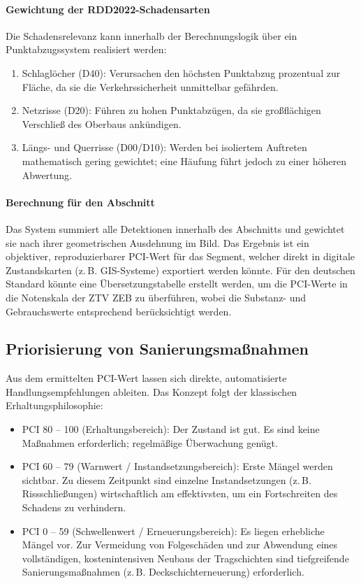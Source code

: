 \paragraph{Gewichtung der RDD2022-Schadensarten}
Die Schadensrelevanz kann innerhalb der Berechnungslogik über ein Punktabzugssystem realisiert werden:
\begin{enumerate}
    \item Schlaglöcher (D40): Verursachen den höchsten Punktabzug prozentual zur Fläche, da sie die Verkehrssicherheit unmittelbar gefährden.
    \item Netzrisse (D20): Führen zu hohen Punktabzügen, da sie großflächigen Verschließ des Oberbaus ankündigen.
    \item Längs- und Querrisse (D00/D10): Werden bei isoliertem Auftreten mathematisch gering gewichtet; eine Häufung führt jedoch zu einer höheren Abwertung.
\end{enumerate}

\paragraph{Berechnung für den Abschnitt}
Das System summiert alle Detektionen innerhalb des Abschnitts und gewichtet sie nach ihrer geometrischen Ausdehnung im Bild. Das Ergebnis ist ein objektiver, reproduzierbarer PCI-Wert für das Segment, welcher direkt in digitale Zustandskarten (z.\,B. GIS-Systeme) exportiert werden könnte. Für den deutschen Standard könnte eine Übersetzungstabelle erstellt werden, um die PCI-Werte in die Notenskala der ZTV ZEB zu überführen, wobei die Substanz- und Gebrauchswerte entsprechend berücksichtigt werden.

\subsection{Priorisierung von Sanierungsmaßnahmen}
\label{subsec:priorisierung}

Aus dem ermittelten PCI-Wert lassen sich direkte, automatisierte Handlungsempfehlungen ableiten. Das Konzept folgt der klassischen Erhaltungsphilosophie:
\begin{itemize}
    \item PCI 80 -- 100 (Erhaltungsbereich): Der Zustand ist gut. Es sind keine Maßnahmen erforderlich; regelmäßige Überwachung genügt.
    \item PCI 60 -- 79 (Warnwert / Instandsetzungsbereich): Erste Mängel werden sichtbar. Zu diesem Zeitpunkt sind einzelne Instandsetzungen (z.\,B. Rissschließungen) wirtschaftlich am effektivsten, um ein Fortschreiten des Schadens zu verhindern.
    \item PCI 0 -- 59 (Schwellenwert / Erneuerungsbereich): Es liegen erhebliche Mängel vor. Zur Vermeidung von Folgeschäden und zur Abwendung eines vollständigen, kostenintensiven Neubaus der Tragschichten sind tiefgreifende Sanierungsmaßnahmen (z.\,B. Deckschichterneuerung) erforderlich.
\end{itemize}

